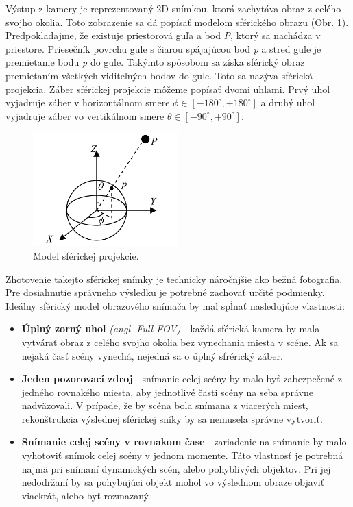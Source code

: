 \documentclass[slovak,master,dept460,male,cpp,cpdeclaration]{diploma}
\begin{document}
Výstup z kamery je reprezentovaný 2D snímkou, ktorá  zachytáva obraz z celého svojho okolia. Toto zobrazenie sa dá popísať  modelom sférického obrazu (Obr. \ref{fig:sphericalModel}). Predpokladajme, že existuje priestorová guľa a bod \textit{P}, ktorý sa nachádza v priestore. Priesečník povrchu gule s čiarou spájajúcou bod \textit{p} a stred gule je premietanie bodu \textit{p} do gule. Takýmto spôsobom sa získa sférický obraz premietaním všetkých viditeľných bodov do gule. Toto sa nazýva sférická projekcia. Záber sférickej projekcie  môžeme popísať dvomi uhlami. Prvý uhol vyjadruje záber v horizontálnom smere $ \phi \in [-180^\circ , +180^\circ ]$ a druhý uhol vyjadruje záber vo vertikálnom smere  $\theta \in [-90^\circ , +90^\circ ]$.
\begin{figure}[H]
	\centering
	\includegraphics[width=0.5\textwidth]{Figures/sphericalModel.png}
	\caption{Model sférickej projekcie.\cite{li2006full}}
	\label{fig:sphericalModel}
\end{figure}
Zhotovenie takejto sférickej snímky je technicky  náročnjšie ako bežná fotografia. Pre dosiahnutie správneho výsledku je potrebné zachovať určité podmienky. Ideálny sférický model obrazového snímača by mal spĺnať nasledujúce vlastnosti:
\begin{itemize}
\item \textbf{Úplný zorný uhol} \textit{(angl. Full FOV)} - každá sférická kamera by mala vytvárať obraz z celého svojho okolia bez vynechania miesta v scéne. Ak sa nejaká časť scény vynechá, nejedná sa o úplný sfrérický záber.
\item \textbf{Jeden pozorovací zdroj} - snímanie celej scény by malo  byť zabezpečené z jedného rovnakého miesta, aby jednotlivé časti scény na seba správne nadväzovali. V prípade, že by scéna bola snímana z viacerých miest, rekonštrukcia výslednej sférickej sníky  by sa nemusela správne vytvoriť.
\item \textbf{Snímanie celej scény v rovnakom čase} - zariadenie na snímanie by malo vyhotoviť snímok celej scény v jednom momente. Táto vlastnosť je potrebná najmä pri snímaní dynamických scén, alebo pohyblivých objektov. Pri jej nedodržaní by sa pohybujúci objekt mohol vo výslednom obraze objaviť viackrát, alebo byť rozmazaný.
\end{itemize}
\newpage
\end{document}
